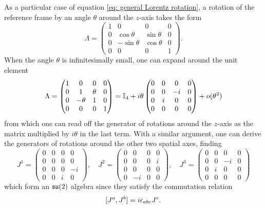 As a particular case of equation \eqref{eq: general Lorentz rotation}, a rotation of the reference frame by an angle $\theta$ around the $z$-axis takes the form 
\begin{equation}
    \Lambda =
    \begin{pmatrix}
        1 & 0 & 0 & 0 \\
        0 & \cos{\theta} & \sin{\theta} & 0 \\
        0 & -\sin{\theta} & \cos{\theta} & 0 \\
        0 & 0 & 0 & 1
    \end{pmatrix}.
\end{equation}
When the angle $\theta$ is infinitesimally small, one can expand around the unit element
\begin{equation}
    \Lambda =
    \begin{pmatrix}
        1 & 0 & 0 & 0 \\
        0 & 1 & \theta & 0 \\
        0 & -\theta & 1 & 0 \\
        0 & 0 & 0 & 1
    \end{pmatrix} = \mathbb{I}_4 +i\theta
    \begin{pmatrix}
        0 & 0 & 0 & 0 \\
        0 & 0 & -i & 0 \\
        0 & i & 0 & 0 \\
        0 & 0 & 0 & 0
    \end{pmatrix} + o(\theta^2)
\end{equation}
from which one can read off the generator of rotations around the $z$-axis as the matrix multiplied by $i\theta$ in the last term. With a similar argument, one can derive the generators of rotations around the other two spatial axes, finding
\begin{equation}
    J^1 = 
    \begin{pmatrix}
        0 & 0 & 0 & 0 \\
        0 & 0 & 0 & 0 \\
        0 & 0 & 0 & -i \\
        0 & 0 & i & 0
    \end{pmatrix},\quad
    J^2 = 
    \begin{pmatrix}
        0 & 0 & 0 & 0 \\
        0 & 0 & 0 & i \\
        0 & 0 & 0 & 0 \\
        0 &-i & 0 & 0
    \end{pmatrix},\quad
    J^3 = 
    \begin{pmatrix}
        0 & 0 & 0 & 0 \\
        0 & 0 & -i & 0 \\
        0 & i & 0 & 0 \\
        0 & 0 & 0 & 0
    \end{pmatrix}
\end{equation}
which form an $\mathfrak{su}(2)$ algebra since they satisfy the commutation relation
\begin{equation}
    [J^a,J^b] = i\epsilon_{abc}J^c.
\end{equation}


